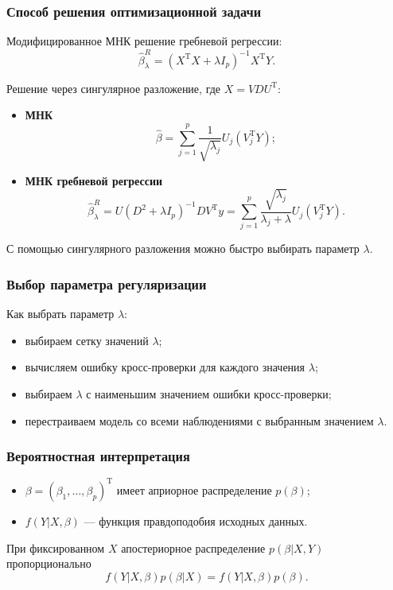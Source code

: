 \documentclass[unicode, notheorems]{beamer}
\newcommand{\T}{\mathrm{T}}
\begin{document}
\begin{frame}
\frametitle{Способ решения оптимизационной задачи}

Модифицированное МНК решение гребневой регрессии:
\[\hat{\beta}_{\lambda}^{R} = (X^{\mathrm{T}}X+ \lambda I_p)^{-1} X^{\mathrm{T}}Y.\]

Решение через сингулярное разложение, где $X = VDU^{\T}$:

\begin{itemize}
\item \textbf{МНК}
\[\hat{\beta} = \sum_{j=1}^p \frac{1}{\sqrt{\lambda_j}} U_j(V_j^{\T}Y);\]
\item \textbf{МНК гребневой регрессии }
\[\hat{\beta}_{\lambda}^{R} = U(D^2 + \lambda I_p)^{-1}DV^{\T}y = \sum_{j=1}^p \frac{\sqrt{\lambda_j}}{\lambda_j + \lambda} U_j(V_j^{\T}Y).\]

\end{itemize}

С помощью сингулярного разложения можно быстро выбирать параметр $\lambda$.

\begin{frame}
\frametitle{Выбор параметра регуляризации}

Как выбрать параметр $\lambda$:
\begin{itemize}
\item выбираем сетку значений $\lambda$;
\item вычисляем ошибку кросс-проверки для каждого значения $\lambda$;
\item выбираем $\lambda$ с наименьшим значением ошибки кросс-проверки;
\item перестраиваем модель со всеми наблюдениями с выбранным значением $\lambda$.
\end{itemize}


\end{frame}





\begin{frame}
\frametitle{Вероятностная интерпретация} 

\begin{itemize}
\item $\beta = (\beta_1, \ldots, \beta_p)^{\T}$ имеет априорное распределение $p(\beta)$;
\item $f(Y|X,\beta)$ --- функция правдоподобия исходных данных. 
\end{itemize}

\vspace{0.3cm}
При фиксированном $X$ апостериорное распределение $p(\beta|X,Y)$ пропорционально 
\[f(Y|X,\beta)p(\beta|X) = f(Y|X,\beta)p(\beta).\]


\end{frame}
\end{frame}
\end{document}
